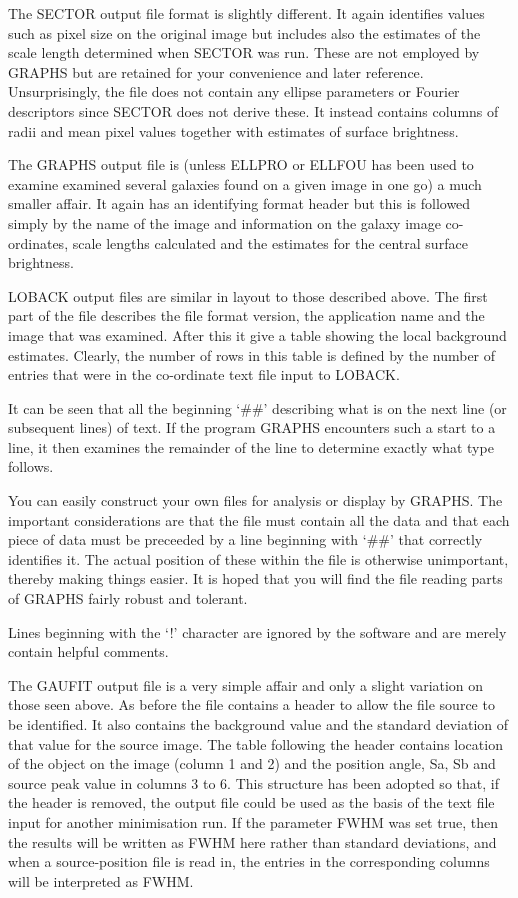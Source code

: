 \documentclass[twoside,11pt]{article}
\begin{document}
The SECTOR output file format is slightly different. It again identifies 
values such as pixel size on the original image but includes
also the estimates of the scale length determined when SECTOR was run.
These are not employed by GRAPHS but are retained for your
convenience and later reference.
Unsurprisingly, the file does not contain
any ellipse parameters or Fourier descriptors since SECTOR does not derive 
these. It instead contains columns of radii and mean pixel values together 
with estimates of surface brightness.     

The GRAPHS output file is (unless ELLPRO or ELLFOU has been used
to examine examined several
galaxies found on a given image in one go) a much smaller affair. 
It again has
an identifying format header but this is followed simply by 
the name of the image and information on the galaxy image co-ordinates, 
scale lengths
calculated and the estimates for the central surface brightness.

LOBACK output files are similar in layout to those described above.
The first part of the file describes the file format version, the
application name and the image that was examined. After this it
give a table showing the local background estimates. Clearly, the
number of rows in this table is defined by the number of entries
that were in the co-ordinate text file input to LOBACK.

It can be seen that all the beginning `\#\#' describing what is on the 
next line (or subsequent lines) of text. If the program GRAPHS 
encounters such a start to a line, it then examines the remainder of the line
to determine exactly what type follows. 

You can easily construct your own files for analysis or display by
GRAPHS. The important
considerations are that the file must contain all the data and that each
piece of data must be preceeded by a line beginning with `\#\#'
that correctly identifies it. The actual position of these 
within the file is otherwise unimportant, thereby making things
easier. It is hoped that you will find the file reading parts of
GRAPHS fairly robust and tolerant.

Lines beginning with the `!' character are ignored by the software
and are merely contain helpful comments.  

The GAUFIT output file is a very simple affair and only a slight
variation on those seen above. As before the file contains a header to
allow the file source to be identified. It also contains the
background value and the standard deviation of that value for the
source image.  The table following the header contains location of the
object on the image (column 1 and 2) and the position angle, Sa, Sb
and source peak value in columns 3 to 6. This structure has been
adopted so that, if the header is removed, the output file could be
used as the basis of the text file input for another minimisation
run.  If the parameter FWHM was set true, then the results will be
written as FWHM here rather than standard deviations, and when a
source-position file is read in, the entries in the corresponding
columns will be interpreted as FWHM.
\end{document}
